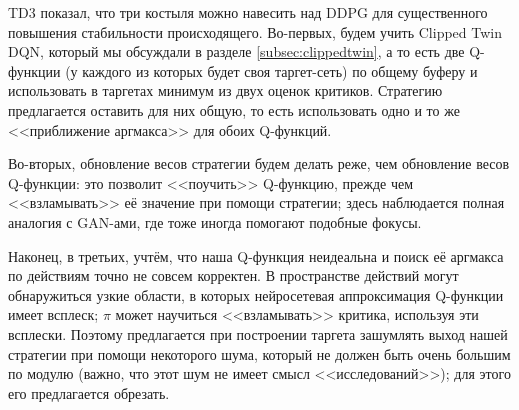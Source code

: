TD3 показал, что три костыля можно навесить над DDPG для существенного повышения стабильности происходящего. Во-первых, будем учить Clipped Twin DQN, который мы обсуждали в разделе \ref{subsec:clippedtwin}, а то есть две Q-функции (у каждого из которых будет своя таргет-сеть) по общему буферу и использовать в таргетах минимум из двух оценок критиков. Стратегию предлагается оставить для них общую, то есть использовать одно и то же <<приближение аргмакса>> для обоих Q-функций. 

Во-вторых, обновление весов стратегии будем делать реже, чем обновление весов Q-функции: это позволит <<поучить>> Q-функцию, прежде чем <<взламывать>> её значение при помощи стратегии; здесь наблюдается полная аналогия с GAN-ами, где тоже иногда помогают подобные фокусы.

Наконец, в третьих, учтём, что наша Q-функция неидеальна и поиск её аргмакса по действиям точно не совсем корректен. В пространстве действий могут обнаружиться узкие области, в которых нейросетевая аппроксимация Q-функции имеет всплеск; $\pi$ может научиться <<взламывать>> критика, используя эти всплески. Поэтому предлагается при построении таргета зашумлять выход нашей стратегии при помощи некоторого шума, который не должен быть очень большим по модулю (важно, что этот шум не имеет смысл <<исследований>>); для этого его предлагается обрезать.

